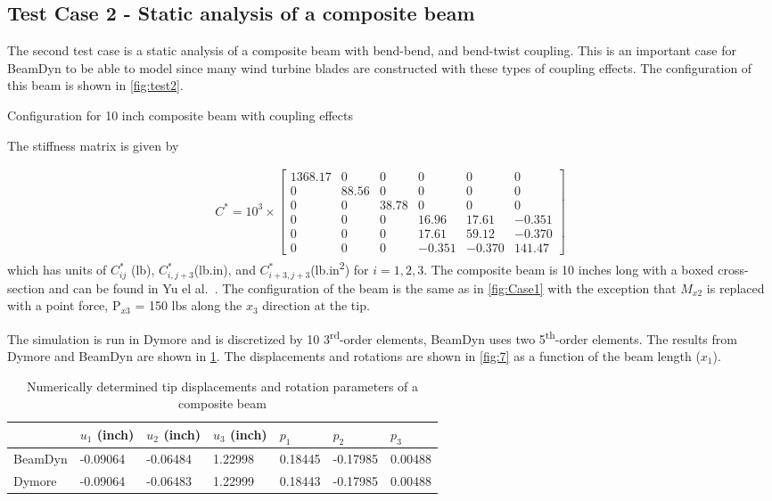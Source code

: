\documentclass[letterpaper,12pt]{article}
\begin{document}
\newpage

\subsection{Test Case 2 - Static analysis of a composite beam}
The second test case is a static analysis of a composite beam with bend-bend, and bend-twist coupling. This is an important case for BeamDyn to be able to model since many wind turbine blades are constructed with these types of coupling effects. The configuration of this beam is shown in \ref{fig:test2}. 
 
  {Configuration for 10 inch composite beam with coupling effects}
 
 The stiffness matrix is given by

\begin{align*}
C^* = 10^3 \times \begin{bmatrix}
	1368.17 & 0     & 0     & 0      & 0      & 0      \\
	0       & 88.56 & 0     & 0      & 0      & 0      \\
	0       & 0     & 38.78 & 0      & 0      & 0      \\
	0       & 0     & 0     & 16.96  & 17.61  & -0.351 \\
	0       & 0     & 0     & 17.61  & 59.12  & -0.370 \\
	0       & 0     & 0     & -0.351 & -0.370 & 141.47
\end{bmatrix}
\end{align*}
which has units of $C^*_{ij}$ (lb), $C^*_{i,j+3}$(lb.in), and $C^*_{i+3, j+3}$(lb.in\textsuperscript{2}) for $i=1, 2, 3$. The composite beam is 10 inches long with a boxed cross-section and can be found in Yu el al.\ \cite{Yu-etal:2002}. The configuration of the beam is the same as in \ref{fig:Case1} with the exception that $M_{x2}$ is replaced with a point force, P$_{x3}$ = 150 lbs along the $x_3$ direction at the tip. 

The simulation is run in Dymore and is discretized by 10 3\textsuperscript{rd}-order elements, BeamDyn uses two 5\textsuperscript{th}-order elements. The results from Dymore and BeamDyn are shown in \ref{tab:results 2}. The displacements and rotations are shown in \ref{fig:7} as a function of the beam length ($x_1$).

\begin{table}
\caption{\label{tab:results 2} Numerically determined tip displacements and rotation parameters of a composite beam}
\begin{center}
    \begin{tabular}{| l | l | l | l | l | l | l |}
    	\hline
    	        & $u_1$ (inch) & $u_2$ (inch) & $u_3$ (inch) & $p_1$   & $p_2$    & $p_3$   \\ \hline
    	BeamDyn & -0.09064     & -0.06484     & 1.22998      & 0.18445 & -0.17985 & 0.00488 \\ \hline
    	Dymore     & -0.09064     & -0.06483     & 1.22999      & 0.18443 & -0.17985 & 0.00488 \\ \hline
    \end{tabular}
\end{center}
\end{table}
\end{document}
